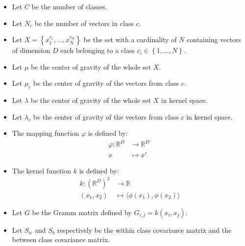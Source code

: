 
\begin{itemize}
  \item Let $C$ be the number of classes.
  \item Let $N_c$ be the number of vectors in class $c$.
  \item Let $X = \left\{x^{c_1}_1, \ldots, x^{c_N}_N\right\}$ be the set with a cardinality of $N$ containing
  vectors of dimension $D$ each belonging to a class $c_i \in \left\{1, ..., N\right\}$.
  \item Let $\mu$ be the center of gravity of the whole set $X$.
  \item Let $\mu_c$ be the center of gravity of the vectors from class $c$.
  \item Let $\lambda$ be the center of gravity of the whole set $X$ in kernel space.
  \item Let $\lambda_c$ be the center of gravity of the vectors from class $c$ in kernel space.
  \item The mapping function $\varphi$ is defined by:
  \begin{align*}
      \varphi : \mathbb{R}^D &\to \mathbb{R}^{D'}\\
      x &\mapsto x'
      \end{align*}
  \item The kernel function $k$ is defined by:
  	\begin{align*}
   		k : \left(\mathbb{R}^D\right)^2 &\to \mathbb{R}\\
   		(x_1, x_2) &\mapsto \langle \phi(x_1), \phi(x_2)\rangle
   	\end{align*}
  \item Let $G$ be the Gramm matrix defined by $G_{i,j} = k(x_i, x_j)$.
  \item Let $S_w$ and $S_b$ respectively be the within class covariance matrix and the between class covariance matrix. 
\end{itemize}
